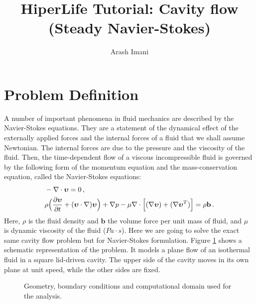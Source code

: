 \documentclass[]{article}
\begin{document}
\title{HiperLife Tutorial: Cavity flow (Steady Navier-Stokes)}
\author{Arash Imani}
\maketitle

\linenumbers

\section{Problem Definition} \label{sec: pd} 
A number of important phenomena in fluid mechanics are described by the Navier-Stokes equations. They are a statement of the dynamical effect of the externally applied forces and the internal forces of a fluid that we shall assume Newtonian. The internal forces are due to the pressure and the viscosity of the fluid.
Then, the time-dependent flow of a viscous incompressible fluid is governed by the following form of the momentum equation and the mass-conservation equation, called the Navier-Stokes equations:\cite{donea2003finite}
\begin{equation}\label{eq1}
	\begin{aligned}
		&-\nabla \cdot \boldsymbol\upsilon = 0\thinspace,\\
		&\rho \Big( \frac{\partial \boldsymbol\upsilon}{\partial t } + (\boldsymbol\upsilon \cdot \nabla) \boldsymbol\upsilon \Big) + \nabla p - \mu \nabla \cdot \Big[(\nabla \boldsymbol\upsilon) + (\nabla \boldsymbol\upsilon^T)  \Big]= \rho \mathbf{b}\thinspace.
	\end{aligned}
\end{equation}
Here, $\rho$ is the fluid density and $\mathbf{b}$ the volume force per unit mass of fluid, and $\mu$ is dynamic viscosity of the fluid ($Pa\cdot s$). Here we are going to solve the exact same cavity flow problem but for Navier-Stokes formulation. Figure \ref{fig_SB} shows a schematic representation of the problem. It models a plane flow of an isothermal fluid in a square lid-driven cavity. The upper side of the cavity moves in its own plane at unit speed, while the other sides are fixed.

\begin{figure}[htbp]
	\centering
	
	\caption{Geometry, boundary conditions and computational domain used for the analysis.}
	\label{fig_SB}
\end{figure}
\end{document}
